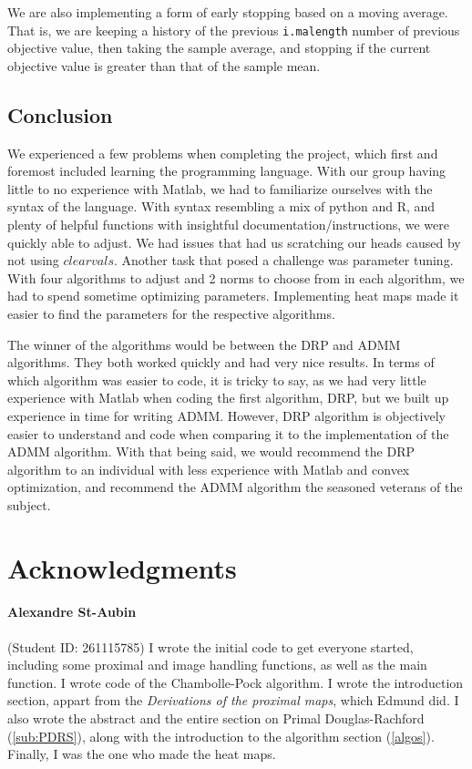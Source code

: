 \documentclass{article}
\theoremstyle{definition}
\theoremstyle{remark}
\begin{document}
\medskip

We are also implementing a form of early stopping based on a moving average. That is, we are keeping a history of the previous \texttt{i.malength} number of previous objective value, then taking the sample average, and stopping if the current objective value is greater than that of the sample mean.



\subsection{Conclusion}

We experienced a few problems when completing the project, which first and foremost included learning the programming language. With our group having little to no experience with Matlab, we had to familiarize ourselves with the syntax of the language. With syntax resembling a mix of python and R, and plenty of helpful functions with insightful documentation/instructions, we were quickly able to adjust. We had issues that had us scratching our heads caused by not using $clearvals$. Another task that posed a challenge was parameter tuning. With four algorithms to adjust and 2 norms to choose from in each algorithm, we had to spend sometime optimizing parameters. Implementing heat maps made it easier to find the parameters for the respective algorithms. 

The winner of the algorithms would be between the DRP and ADMM algorithms. They both worked quickly and had very nice results. In terms of which algorithm was easier to code, it is tricky to say, as we had very little experience with Matlab when coding the first algorithm, DRP, but we built up experience in time for writing ADMM. However, DRP algorithm is objectively easier to understand and code when comparing it to the implementation of the ADMM algorithm. With that being said, we would recommend the DRP algorithm to an individual with less experience with Matlab and convex optimization, and recommend the ADMM algorithm the seasoned veterans of the subject. 
\newpage 
\section*{Acknowledgments}

\paragraph{Alexandre St-Aubin} (Student ID: 261115785) I wrote the initial code to get everyone started, including some proximal and image handling functions, as well as the main function. I wrote code of the Chambolle-Pock algorithm. I wrote the introduction section, appart from the \textit{Derivations of the proximal maps}, which Edmund did. I also wrote the abstract and the entire section on Primal Douglas-Rachford (\ref{sub:PDRS}), along with the introduction to the algorithm section (\ref{algos}). Finally, I was the one who made the heat maps.
\end{document}
